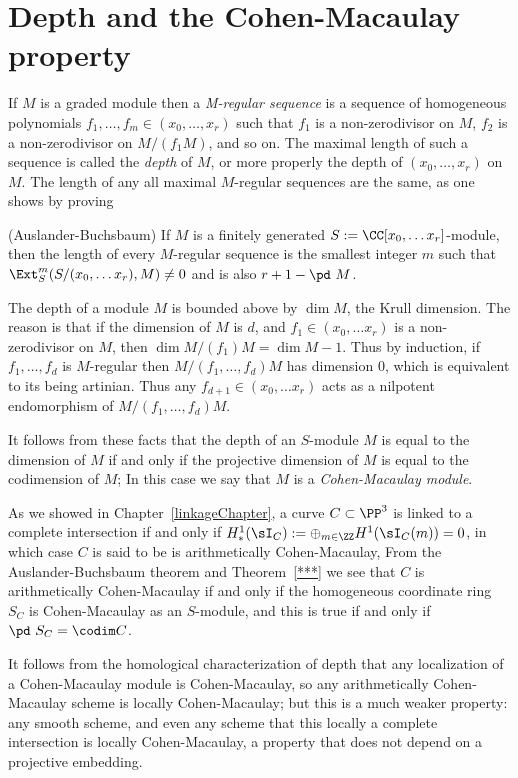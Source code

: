 \section{Depth and the Cohen-Macaulay property}

If $M$ is a graded module then a \emph{M-regular sequence} is a sequence of homogeneous polynomials
$f_1,\dots,f_m \in (x_0,\dots, x_r)$ such that $f_1$ is a non-zerodivisor on $M$, $f_2$ is a non-zerodivisor on $M/(f_1M)$, and so on. 
The maximal length of such a sequence is called the \emph{depth} of $M$, or more properly the depth of $(x_0,\dots, x_r)$ on $M$.
The length of any all maximal $M$-regular sequences are the same, as one shows by proving

\begin{theorem} (Auslander-Buchsbaum)
If $M$ is a finitely generated $S := \CC[x_0, \dots x_r]$-module, then the length of every $M$-regular sequence is
the smallest integer $m$ such that $\Ext_S^m(S/(x_0, \dots x_r), M) \neq 0$ and is also $r+1 - \pd\  M$.
\end{theorem}
 
 The depth of a module $M$ is bounded above by $\dim M$, the Krull dimension. The reason is that if the dimension of $M$
 is $d$, and $f_1 \in (x_0, \dots x_r) $ is a non-zerodivisor on $M$, then $\dim M/(f_1)M= \dim M-1$. Thus by induction, if
  $f_1,\dots, f_d$ is $M$-regular then $M/(f_1, \dots, f_d)M$ has dimension 0, which is equivalent to its being artinian. Thus any 
$ f_{d+1} \in(x_0, \dots x_r) $ acts as a nilpotent endomorphism of $M/(f_1, \dots, f_d)M$.

It follows from these facts that the depth of an $S$-module $M$ is equal to the dimension of $M$ if and only if the projective dimension
of $M$ is equal to the codimension of $M$; In this case we say that $M$ is a
\emph{Cohen-Macaulay module}. 

As we showed in Chapter~\ref{linkageChapter}, a curve $C\subset \PP^3$ is linked to a complete intersection
if and only if  $H^1_*(\sI_C) := \oplus_{m\in \ZZ} H^1(\sI_C(m)) = 0$, in which case $C$ is said to be is arithmetically Cohen-Macaulay,
From the Auslander-Buchsbaum theorem and Theorem~\ref{***} we see that $C$ is arithmetically Cohen-Macaulay if
and only if the homogeneous coordinate ring $S_C$ is Cohen-Macaulay as an $S$-module, and this is true
if and only if $\pd\  S_C = \codim C$.

It follows from the homological characterization of depth that any localization of a Cohen-Macaulay module is Cohen-Macaulay,
so any arithmetically Cohen-Macaulay scheme is locally Cohen-Macaulay; but this is a much weaker property: any smooth
scheme, and even any scheme that this locally a complete intersection is locally Cohen-Macaulay, a property that does
not depend on a projective embedding.


